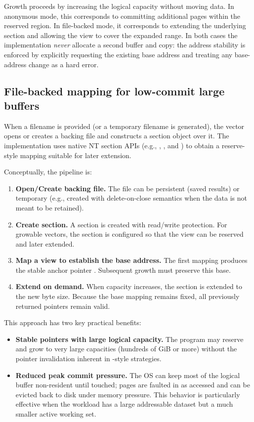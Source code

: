 Growth proceeds by increasing the logical capacity 
without moving data. In anonymous mode, this corresponds to committing
additional pages within the reserved region. In file-backed mode, it corresponds
to extending the underlying section and allowing the view to cover the expanded
range. In both cases the implementation \emph{never} allocate a second buffer and
copy: the address stability is enforced by explicitly requesting the existing
base address and treating any base-address change as a hard error.

\subsection{File-backed mapping for low-commit large buffers}
\label{sec:file_backed_mapping}

When a filename is provided (or a temporary filename is generated), the vector
opens or creates a backing file and constructs a section object over it. The implementation uses
native NT section APIs (e.g., ,
, and ) to obtain a
reserve-style mapping suitable for later extension.

Conceptually, the pipeline is:
\begin{enumerate}
  \item \textbf{Open/Create backing file.} The file can be persistent (saved
  results) or temporary (e.g., created with delete-on-close semantics when the
  data is not meant to be retained).
  \item \textbf{Create section.} A section is created with read/write
  protection. For growable vectors, the section is configured so that the view
  can be reserved and later extended.
  \item \textbf{Map a view to establish the base address.} The first mapping
  produces the stable anchor pointer . Subsequent growth must
  preserve this base.
  \item \textbf{Extend on demand.} When capacity increases, the section is
  extended to the new byte size. Because the base mapping remains fixed, all
  previously returned pointers remain valid.
\end{enumerate}

This approach has two key practical benefits:
\begin{itemize}
  \item \textbf{Stable pointers with large logical capacity.} The program may
  reserve and grow to very large capacities (hundreds of GiB or more) without
  the pointer invalidation inherent in -style strategies.
  \item \textbf{Reduced peak commit pressure.} The OS can keep most of the
  logical buffer non-resident until touched; pages are faulted in as accessed
  and can be evicted back to disk under memory pressure. This behavior is particularly
  effective when the workload has a large addressable dataset but a much smaller
  active working set.
\end{itemize}

